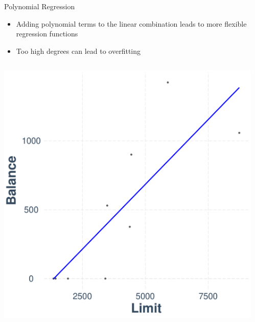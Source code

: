 \documentclass[11pt,compress,t,notes=noshow, xcolor=table]{beamer}
\begin{document}
\begin{vbframe}{Polynomial Regression}

\begin{itemize}
\small \item Adding polynomial terms to the linear combination leads to more flexible regression functions 
\small \item Too high degrees can lead to overfitting
\end{itemize}

\vspace{1cm}

\begin{columns}  
\begin{column}{0.3\textwidth} 
\tiny {}
 \includegraphics[width = \textwidth]{figure/nutshell-regression-poly-plot-1.pdf}
\end{column}
\begin{column}{0.3\textwidth} 
\tiny {}

\end{column}
\end{columns}
\end{vbframe}
\end{document}
